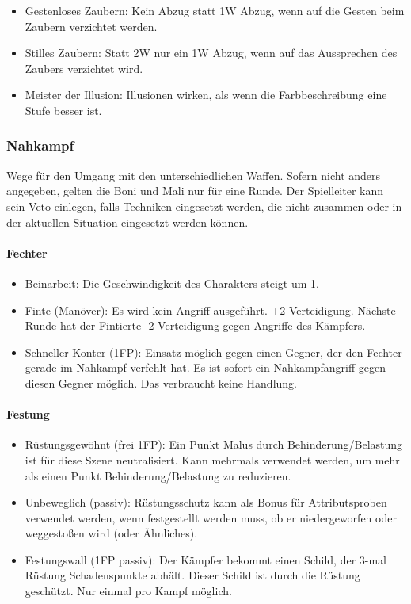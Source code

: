 \documentclass{article}
\begin{document}
\begin{itemize}
\item Gestenloses Zaubern: Kein Abzug statt 1W Abzug, wenn auf die Gesten beim Zaubern verzichtet werden.
\item Stilles Zaubern: Statt 2W nur ein 1W Abzug, wenn auf das Aussprechen des Zaubers verzichtet wird.
\item Meister der Illusion: Illusionen wirken, als wenn die Farbbeschreibung eine Stufe besser ist.
\end{itemize}

\subsubsection{Nahkampf}

Wege für den Umgang mit den unterschiedlichen Waffen. Sofern nicht anders angegeben, gelten die Boni und Mali nur für
eine Runde. Der Spielleiter kann sein Veto einlegen, falls Techniken eingesetzt werden, die nicht zusammen oder in
der aktuellen Situation eingesetzt werden können.

\paragraph{Fechter}

\begin{itemize}
\item Beinarbeit: Die Geschwindigkeit des Charakters steigt um 1.
\item Finte (Manöver): Es wird kein Angriff ausgeführt. +2 Verteidigung. Nächste Runde hat der Fintierte -2 Verteidigung gegen Angriffe des Kämpfers.
\item Schneller Konter (1FP): Einsatz möglich gegen einen Gegner, der den Fechter gerade im Nahkampf verfehlt hat. Es ist sofort ein Nahkampfangriff gegen diesen Gegner möglich. Das verbraucht keine Handlung.
\end{itemize}

\paragraph{Festung}

\begin{itemize}
\item Rüstungsgewöhnt (frei 1FP): Ein Punkt Malus durch Behinderung/Belastung ist für diese Szene neutralisiert. Kann mehrmals verwendet werden, um mehr als einen Punkt Behinderung/Belastung zu reduzieren.
\item Unbeweglich (passiv): Rüstungsschutz kann als Bonus für Attributsproben verwendet werden, wenn festgestellt werden muss, ob er niedergeworfen oder weggestoßen wird (oder Ähnliches).
\item Festungswall (1FP passiv): Der Kämpfer bekommt einen Schild, der 3-mal Rüstung Schadenspunkte abhält. Dieser Schild ist durch die Rüstung geschützt. Nur einmal pro Kampf möglich.
\end{itemize}
\end{document}
